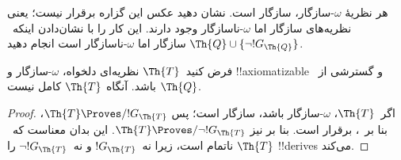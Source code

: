 \documentclass[../../../include/open-logic-section]{subfiles}
\begin{document}
\begin{prob}
  هر نظریهٔ $\omega$-سازگار، سازگار است. نشان دهید عکس این گزاره برقرار
  نیست؛ یعنی نظریه‌های سازگار اما $\omega$-ناسازگار وجود دارند. این کار
  را با نشان‌دادن اینکه~$\Th{Q} \cup
  \{\lnot !G_\Th{Q}\}$ سازگار اما $\omega$-ناسازگار است انجام دهید.
\end{prob}

\begin{thm}
 فرض کنید~$\Th{T}$ نظریه‌ای دلخواه،
$\omega$-سازگار و !!{axiomatizable} و گسترشی از~$\Th{Q}$ باشد. آنگاه
$\Th{T}$ کامل نیست.
\end{thm}

\begin{proof}
  اگر~$\Th{T}$، $\omega$-سازگار باشد، سازگار است؛ پس
  $\Th{T} \Proves/ !G_\Th{T}$، بنا بر~، برقرار
  است. بنا بر
   نیز
  $\Th{T} \Proves/ \lnot !G_\Th{T}$. این بدان معناست که~$\Th{T}$
  ناتمام است، زیرا نه~$!G_\Th{T}$ و نه~$\lnot !G_\Th{T}$ را !!{derive}s می‌کند.
\end{proof}
\end{document}
